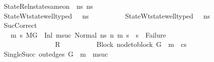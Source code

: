 \begin{isabellebody}
\ \ \ \ \ \ \ \ \ StateRel{\isacharcolon}{\kern0pt}{\isachardoublequoteopen}nstate{\isacharunderscore}{\kern0pt}same{\isacharunderscore}{\kern0pt}on\ {\isasymLambda}\ ns{}\ ns{}\ {\isacharbraceleft}{\kern0pt}{\isacharbraceright}{\kern0pt}{\isachardoublequoteclose}\ \isanewline
\ \ \ \ \ \ \ \ \ StateWt{\isacharcolon}{\kern0pt}{\isachardoublequoteopen}state{\isacharunderscore}{\kern0pt}well{\isacharunderscore}{\kern0pt}typed\ {\isasymLambda}\ {\isasymOmega}\ ns{}{\isachardoublequoteclose}\ \isanewline
\ \ \ \ \ \ \ \ \ StateWt{}{\isacharcolon}{\kern0pt}{\isachardoublequoteopen}state{\isacharunderscore}{\kern0pt}well{\isacharunderscore}{\kern0pt}typed\ {\isasymLambda}\ {\isasymOmega}\ ns{}{\isachardoublequoteclose}\ \isanewline
\ \ \ \ \ \ \ \ \ SucCorrect{\isacharcolon}{\kern0pt}\isanewline
\ \ \ \ \ \ \ \ \ \ {\isachardoublequoteopen}{\isacharparenleft}{\kern0pt}{\isasymAnd}\ m{}{\isacharprime}{\kern0pt}\ s{}{\isacharprime}{\kern0pt}{\isachardot}{\kern0pt}\ {\isacharparenleft}{\kern0pt}{\isacharparenleft}{\kern0pt}M{\isacharcomma}{\kern0pt}{\isasymLambda}{\isacharcomma}{\kern0pt}{\isasymGamma}{\isacharcomma}{\kern0pt}{\isasymOmega}{\isacharcomma}{\kern0pt}G\ {\isasymturnstile}\ {\isacharparenleft}{\kern0pt}Inl\ m{\isacharunderscore}{\kern0pt}suc{\isacharcomma}{\kern0pt}\ Normal\ ns{}{\isacharparenright}{\kern0pt}\ {\isacharminus}{\kern0pt}n{\isasymrightarrow}{\isacharasterisk}{\kern0pt}\ {\isacharparenleft}{\kern0pt}m{}{\isacharprime}{\kern0pt}{\isacharcomma}{\kern0pt}\ s{}{\isacharprime}{\kern0pt}{\isacharparenright}{\kern0pt}{\isacharparenright}{\kern0pt}\ {\isasymLongrightarrow}\ {\isacharparenleft}{\kern0pt}s{}{\isacharprime}{\kern0pt}\ {\isasymnoteq}\ Failure{\isacharparenright}{\kern0pt}{\isacharparenright}{\kern0pt}{\isacharparenright}{\kern0pt}{\isasymLongrightarrow}\isanewline
\ \ \ \ \ \ \ \ \ \ \ \ \ \ \ \ \ \ \ \ \ \ \ \ R{\isachardoublequoteclose}\ \isanewline
\ \ \ \ \ \ \ \ \ Block{\isacharcolon}{\kern0pt}\ {\isachardoublequoteopen}node{\isacharunderscore}{\kern0pt}to{\isacharunderscore}{\kern0pt}block\ G\ {\isacharbang}{\kern0pt}\ m\ {\isacharequal}{\kern0pt}\ cs{\isachardoublequoteclose}\ \ \isanewline
\ \ \ \ \ \ \ \ \ SingleSucc{\isacharcolon}{\kern0pt}\ {\isachardoublequoteopen}out{\isacharunderscore}{\kern0pt}edges\ G\ {\isacharbang}{\kern0pt}\ m\ {\isacharequal}{\kern0pt}\ {\isacharbrackleft}{\kern0pt}m{\isacharunderscore}{\kern0pt}suc{\isacharbrackright}{\kern0pt}{\isachardoublequoteclose}\ \isanewline

\end{isabellebody}
